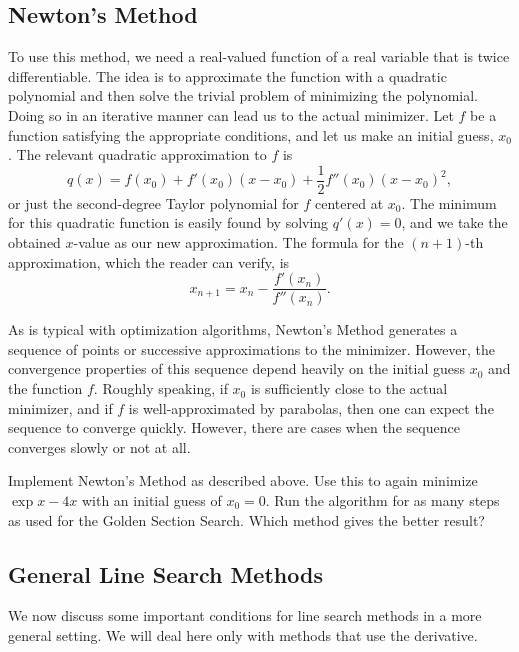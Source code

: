 \subsection*{Newton's Method}
To use this method, we need a real-valued function of a real variable that is twice 
differentiable. The idea is to approximate the function with a quadratic polynomial and 
then solve the trivial problem of minimizing the polynomial. Doing so in an iterative 
manner can lead us to the actual minimizer. Let $f$ be a function satisfying the 
appropriate conditions, and let us make an initial guess, $x_0$. The relevant quadratic 
approximation to $f$ is 
\begin{equation*}
q(x) = f(x_0) + f'(x_0)(x-x_0) + \frac{1}{2}f''(x_0)(x-x_0)^2,
\end{equation*}
or just the second-degree Taylor polynomial for $f$ centered at $x_0$. The minimum 
for this quadratic function is easily found by solving $q'(x) = 0$, and we take the 
obtained $x$-value as our new approximation. The formula for the $(n+1)$-th 
approximation, which the reader can verify, is 
\begin{equation*}
x_{n+1} = x_n - \frac{f'(x_n)}{f''(x_n)}.
\end{equation*}

As is typical with optimization algorithms, Newton's Method generates a sequence of 
points or successive approximations to the minimizer. However, the convergence 
properties of this sequence depend heavily on the initial guess $x_0$ and the function 
$f$. Roughly speaking, if $x_0$ is sufficiently close to the actual minimizer, and if 
$f$ is well-approximated by parabolas, then one can expect the sequence to converge 
quickly. However, there are cases when the sequence converges slowly or not at all.

\begin{problem}
Implement Newton's Method as described above. Use this to again minimize $\exp{x} - 4x$ 
with an initial guess of $x_0 = 0$. Run the algorithm for as many steps as used for the 
Golden Section Search. Which method gives the better result?
\end{problem}

\subsection*{General Line Search Methods}
We now discuss some important conditions for line search methods in a more general 
setting. We will deal here only with methods that use the derivative.

